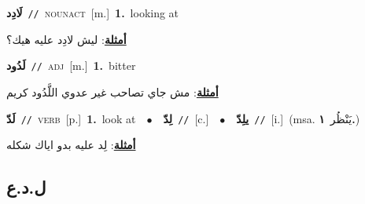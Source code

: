 \documentclass[10pt,a4paper,twoside]{article} %
\begin{document}
\begin{multicols}{2}
{\setlength\topsep{0pt}\textbf{\foreignlanguage{arabic}{لَادِد}}\ {\color{gray}\texttt{//}\color{black}}\ \textsc{noun\textunderscore act}\ [m.]\ \textbf{1.}~looking at\  \begin{flushright}\color{gray}\foreignlanguage{arabic}{\textbf{\underline{\foreignlanguage{arabic}{أمثلة}}}: ليش لادِد عليه هيك؟}\end{flushright}\color{black}} \vspace{2mm}

{\setlength\topsep{0pt}\textbf{\foreignlanguage{arabic}{لَدُود}}\ {\color{gray}\texttt{//}\color{black}}\ \textsc{adj}\ [m.]\ \textbf{1.}~bitter\  \begin{flushright}\color{gray}\foreignlanguage{arabic}{\textbf{\underline{\foreignlanguage{arabic}{أمثلة}}}: مش جاي تصاحب غير عدوي اللَّدُود كريم}\end{flushright}\color{black}} \vspace{2mm}

{\setlength\topsep{0pt}\textbf{\foreignlanguage{arabic}{لَدّ}}\ {\color{gray}\texttt{//}\color{black}}\ \textsc{verb}\ [p.]\ \textbf{1.}~look at\ \ $\bullet$\ \ \setlength\topsep{0pt}\textbf{\foreignlanguage{arabic}{لِدّ}}\ {\color{gray}\texttt{//}\color{black}}\ [c.]\ \ $\bullet$\ \ \setlength\topsep{0pt}\textbf{\foreignlanguage{arabic}{يلِدّ}}\ {\color{gray}\texttt{//}\color{black}}\ [i.]\ \color{gray}(msa. \foreignlanguage{arabic}{يَنْظُر}~\foreignlanguage{arabic}{\textbf{١.}})\color{black}\  \begin{flushright}\color{gray}\foreignlanguage{arabic}{\textbf{\underline{\foreignlanguage{arabic}{أمثلة}}}: لِد عليه بدو اياك شكله}\end{flushright}\color{black}} \vspace{2mm}

\vspace{-3mm}
\subsection*{\color{blue}\foreignlanguage{arabic}{ل.د.ع}\color{blue}{}} 


\end{multicols}
\end{document}
